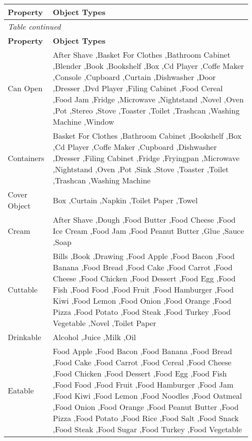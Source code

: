 \begin{longtable}{|p{}|p{}|}
\hline
\textbf{Property} & \textbf{Object Types} \\
\hline
\endfirsthead

\multicolumn{2}{l}{\textit{Table continued}}\\ \hline
\textbf{Property} & \textbf{Object Types} \\
\hline
\endhead

\hline
\endfoot

\hline
\endlastfoot

Can Open & After Shave  ,Basket For Clothes  ,Bathroom Cabinet  ,Blender  ,Book  ,Bookshelf  ,Box  ,Cd Player  ,Coffe Maker  ,Console  ,Cupboard  ,Curtain  ,Dishwasher  ,Door  ,Dresser  ,Dvd Player  ,Filing Cabinet  ,Food Cereal  ,Food Jam  ,Fridge  ,Microwave  ,Nightstand  ,Novel  ,Oven  ,Pot  ,Stereo  ,Stove  ,Toaster  ,Toilet  ,Trashcan  ,Washing Machine  ,Window  \\
\hline
Containers & Basket For Clothes  ,Bathroom Cabinet  ,Bookshelf  ,Box  ,Cd Player  ,Coffe Maker  ,Cupboard  ,Dishwasher  ,Dresser  ,Filing Cabinet  ,Fridge  ,Fryingpan  ,Microwave  ,Nightstand  ,Oven  ,Pot  ,Sink  ,Stove  ,Toaster  ,Toilet  ,Trashcan  ,Washing Machine  \\
\hline
Cover Object & Box  ,Curtain  ,Napkin  ,Toilet Paper  ,Towel  \\
\hline
Cream & After Shave  ,Dough  ,Food Butter  ,Food Cheese  ,Food Ice Cream  ,Food Jam  ,Food Peanut Butter  ,Glue  ,Sauce  ,Soap  \\
\hline
Cuttable & Bills  ,Book  ,Drawing  ,Food Apple  ,Food Bacon  ,Food Banana  ,Food Bread  ,Food Cake  ,Food Carrot  ,Food Cheese  ,Food Chicken  ,Food Dessert  ,Food Egg  ,Food Fish  ,Food Food  ,Food Fruit  ,Food Hamburger  ,Food Kiwi  ,Food Lemon  ,Food Onion  ,Food Orange  ,Food Pizza  ,Food Potato  ,Food Steak  ,Food Turkey  ,Food Vegetable  ,Novel  ,Toilet Paper  \\
\hline
Drinkable & Alcohol  ,Juice  ,Milk  ,Oil  \\
\hline
Eatable & Food Apple  ,Food Bacon  ,Food Banana  ,Food Bread  ,Food Cake  ,Food Carrot  ,Food Cereal  ,Food Cheese  ,Food Chicken  ,Food Dessert  ,Food Egg  ,Food Fish  ,Food Food  ,Food Fruit  ,Food Hamburger  ,Food Jam  ,Food Kiwi  ,Food Lemon  ,Food Noodles  ,Food Oatmeal  ,Food Onion  ,Food Orange  ,Food Peanut Butter  ,Food Pizza  ,Food Potato  ,Food Rice  ,Food Salt  ,Food Snack  ,Food Steak  ,Food Sugar  ,Food Turkey  ,Food Vegetable  \\

\end{longtable}
